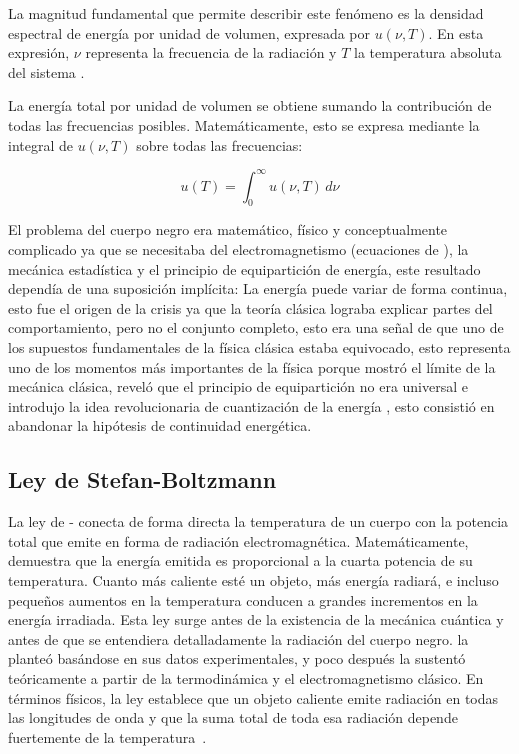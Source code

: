 \documentclass[11pt,a4paper,spanish]{book}
\begin{document}
La magnitud fundamental que permite describir este fenómeno es la
densidad espectral de energía por unidad de volumen,
expresada por \(u(\nu,T)\).  En esta expresión, \(\nu\) representa la
frecuencia de la radiación y
\(T\) la temperatura absoluta del sistema \citep{planck1900}.

La energía total por unidad de volumen se obtiene sumando la
contribución de todas
las frecuencias posibles. Matemáticamente, esto se expresa mediante la
integral de \(u(\nu,T)\) sobre todas las frecuencias:

\begin{equation}
  u(T)=\int_{0}^{\infty} u(\nu, T)\, d\nu
\end{equation}

El problema del cuerpo negro era matemático, físico y conceptualmente
complicado ya que se necesitaba del electromagnetismo (ecuaciones de
\cite{maxwell1865}),
la mecánica estadística y el principio de equipartición de energía,
este resultado dependía de una suposición implícita: La energía puede variar de
forma continua, esto fue el origen de la crisis ya que la teoría
clásica lograba explicar partes del comportamiento, pero no el
conjunto completo,
esto era una señal de que uno de los supuestos fundamentales de la
física clásica estaba equivocado, esto representa uno de los momentos
más importantes
de la física porque mostró el límite de la mecánica clásica, reveló
que el principio de equipartición no era universal e introdujo la
idea revolucionaria
de cuantización de la energía , esto consistió en abandonar la
hipótesis de continuidad energética.

\subsection{Ley de Stefan-Boltzmann}

La ley de \cite{stefan1879}-\cite{boltzmann1884} conecta de forma
directa la temperatura de
un cuerpo con la potencia total que emite en forma de radiación
electromagnética. Matemáticamente, demuestra que la energía emitida
es proporcional a la cuarta potencia de su temperatura. Cuanto más
caliente esté un objeto, más energía radiará, e incluso pequeños
aumentos en la temperatura conducen a grandes incrementos en la
energía irradiada. Esta ley surge antes de la existencia de la
mecánica cuántica y antes de que se entendiera detalladamente la
radiación del cuerpo negro. \cite{stefan1879} la planteó basándose en
sus datos experimentales, y poco después \cite{boltzmann1884} la
sustentó teóricamente a partir de la termodinámica y el
electromagnetismo clásico. En términos físicos, la ley establece que
un objeto caliente emite radiación en todas las longitudes de onda y
que la suma total de toda esa radiación depende fuertemente de la
temperatura~\citep{stefan1879}.
\end{document}
